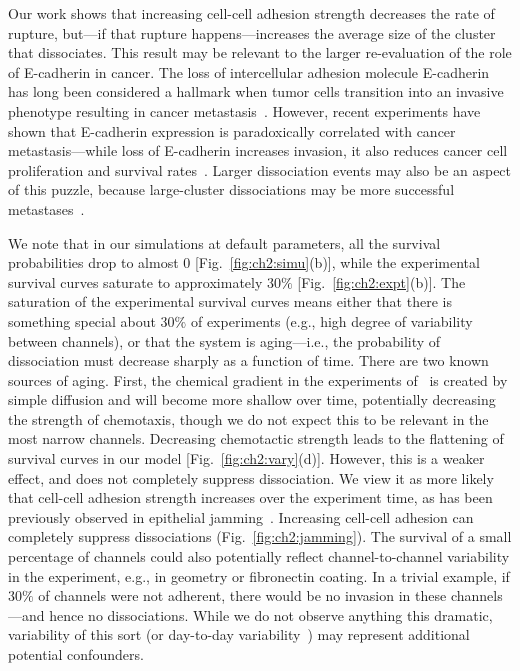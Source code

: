 Our work shows that increasing cell-cell adhesion strength decreases the rate of rupture, but---if that rupture happens---increases the average size of the cluster that dissociates.
This result may be relevant to the larger re-evaluation of the role of E-cadherin in cancer.
The loss of intercellular adhesion molecule E-cadherin has long been considered a hallmark when tumor cells transition into an invasive phenotype resulting in cancer metastasis~\cite{russo2024cadherin}.
However, recent experiments have shown that E-cadherin expression is paradoxically correlated with cancer metastasis---while loss of E-cadherin increases invasion, it also reduces cancer cell proliferation and survival rates~\cite{padmanaban2019cadherin, russo2024cadherin}.
Larger dissociation events may also be an aspect of this puzzle, because large-cluster dissociations may be more successful metastases~\cite{cheung2016collective}.

We note that in our simulations at default parameters, all the survival probabilities drop to almost $0$ [Fig.~\ref{fig:ch2:simu}(b)], while the experimental survival curves saturate to approximately $30\%$ [Fig.~\ref{fig:ch2:expt}(b)].
The saturation of the experimental survival curves means either that there is something special about $30\%$ of experiments (e.g., high degree of variability between channels), or that the system is aging---i.e., the probability of dissociation must decrease sharply as a function of time.
There are two known sources of aging.
First, the chemical gradient in the experiments of~\cite{law2023cytokinesis} is created by simple diffusion and will become more shallow over time, potentially decreasing the strength of chemotaxis, though we do not expect this to be relevant in the most narrow channels.
Decreasing chemotactic strength leads to the flattening of survival curves in our model [Fig.~\ref{fig:ch2:vary}(d)].
However, this is a weaker effect, and does not completely suppress dissociation.
We view it as more likely that cell-cell adhesion strength increases over the experiment time, as has been previously observed in epithelial jamming~\cite{garcia2015physics}.
Increasing cell-cell adhesion can completely suppress dissociations (Fig.~\ref{fig:ch2:jamming}).
The survival of a small percentage of channels could also potentially reflect channel-to-channel variability in the experiment, e.g., in geometry or fibronectin coating.
In a trivial example, if $30\%$ of channels were not adherent, there would be no invasion in these channels---and hence no dissociations.
While we do not observe anything this dramatic, variability of this sort (or day-to-day variability~\cite{lord2020superplots}) may represent additional potential confounders.

